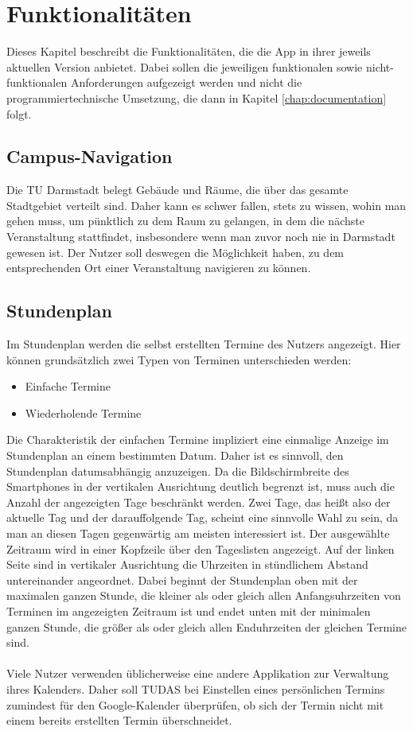 \documentclass[noindent]{tudreport}
\begin{document}
	\chapter{Funktionalitäten}\label{chap:functionalities}
		Dieses Kapitel beschreibt die Funktionalitäten, die die App in ihrer jeweils aktuellen Version anbietet. Dabei sollen die jeweiligen funktionalen sowie nicht-funktionalen Anforderungen aufgezeigt werden und nicht die programmiertechnische Umsetzung, die dann in Kapitel \ref{chap:documentation} folgt.
		
		\section{Campus-Navigation}\label{sec:campus_navigation}
			Die TU Darmstadt belegt Gebäude und Räume, die über das gesamte Stadtgebiet verteilt sind. Daher kann es schwer fallen, stets zu wissen, wohin man gehen muss, um pünktlich zu dem Raum zu gelangen, in dem die nächste Veranstaltung stattfindet, insbesondere wenn man zuvor noch nie in Darmstadt gewesen ist. Der Nutzer soll deswegen die Möglichkeit haben, zu dem entsprechenden Ort einer Veranstaltung navigieren zu können.
		
		\section{Stundenplan}\label{sec:timetable}
			Im Stundenplan werden die selbst erstellten Termine des Nutzers angezeigt. Hier können grundsätzlich zwei Typen von Terminen unterschieden werden:
			\begin{itemize}
				\item Einfache Termine
				
				\item Wiederholende Termine
			\end{itemize}
			Die Charakteristik der einfachen Termine impliziert eine einmalige Anzeige im Stundenplan an einem bestimmten Datum. Daher ist es sinnvoll, den Stundenplan datumsabhängig anzuzeigen. Da die Bildschirmbreite des Smartphones in der vertikalen Ausrichtung deutlich begrenzt ist, muss auch die Anzahl der angezeigten Tage beschränkt werden. Zwei Tage, das heißt also der aktuelle Tag und der darauffolgende Tag, scheint eine sinnvolle Wahl zu sein, da man an diesen Tagen gegenwärtig am meisten interessiert ist. Der ausgewählte Zeitraum wird in einer Kopfzeile über den Tageslisten angezeigt. Auf der linken Seite sind in vertikaler Ausrichtung die Uhrzeiten in stündlichem Abstand untereinander angeordnet. Dabei beginnt der Stundenplan oben mit der maximalen ganzen Stunde, die kleiner als oder gleich allen Anfangsuhrzeiten von Terminen im angezeigten Zeitraum ist und endet unten mit der minimalen ganzen Stunde, die größer als oder gleich allen Enduhrzeiten der gleichen Termine sind.\\\\
			Viele Nutzer verwenden üblicherweise eine andere Applikation zur Verwaltung ihres Kalenders. Daher soll TUDAS bei Einstellen eines persönlichen Termins zumindest für den Google-Kalender überprüfen, ob sich der Termin nicht mit einem bereits erstellten Termin überschneidet.
		
\end{document}
